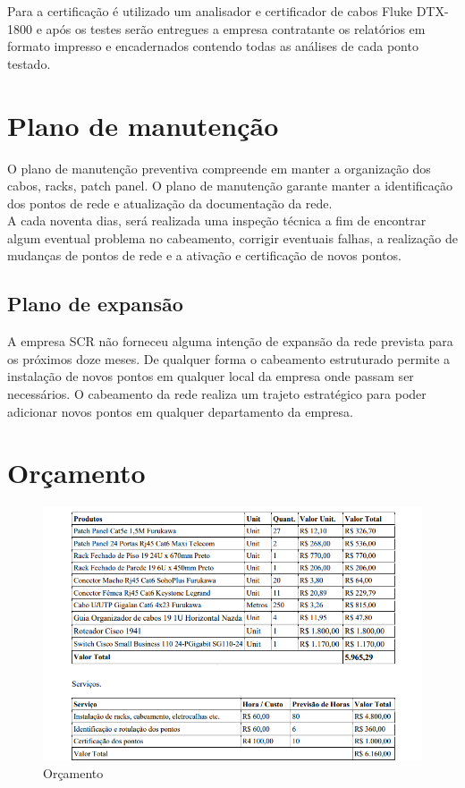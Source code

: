 \documentclass[	DIV=calc,%
							paper=a4,%
							fontsize=12pt,%
							onecolumn]{scrartcl}	 					%
\begin{document}
Para a certificação é utilizado um analisador e certificador de cabos Fluke DTX-1800 e após os testes serão entregues a empresa contratante os relatórios em formato impresso e encadernados contendo todas as análises de cada ponto testado.

\section{Plano de manutenção}

O plano de manutenção preventiva compreende em manter a organização dos cabos, racks, patch panel. O plano de manutenção garante manter a identificação dos pontos de rede e atualização da documentação da rede.
\\

A cada noventa dias, será realizada uma inspeção técnica a fim de encontrar algum eventual problema no cabeamento, corrigir eventuais falhas, a realização de mudanças de pontos de rede e a ativação e certificação de novos pontos.

\subsection{Plano de expansão}
A empresa SCR não forneceu alguma intenção de expansão da rede prevista para os próximos doze meses. De qualquer forma o cabeamento estruturado permite a instalação de novos pontos em qualquer local da empresa onde passam ser necessários. O cabeamento da rede realiza um trajeto estratégico para poder adicionar novos pontos em qualquer departamento da empresa.


\section{Orçamento}

\begin{figure}
	\centering
	\includegraphics[height=\textwidth]{orcamento}
	\caption{Orçamento}
	\label{orcamento}
\end{figure}
\end{document}
